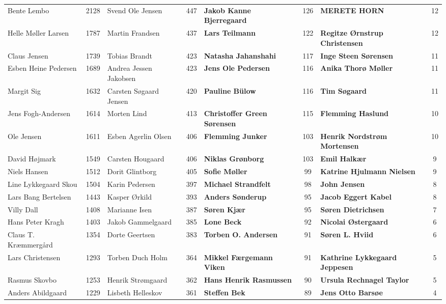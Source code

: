 \begin{table}[h]
\begin{tabular}{l|c|l|c|l|c|l|c}
		Bente Lembo & 2128 & Svend Ole Jensen & 447 & \textbf{Jakob Kanne Bjerregaard} & 126 & \textbf{MERETE HORN} & 12 \\
		Helle Møller Larsen & 1787 & Martin Frandsen & 437 & \textbf{Lars Teilmann} & 122 & \textbf{Regitze Ørnstrup Christensen} & 12 \\
		Claus Jensen & 1739 & Tobias Brandt & 423 & \textbf{Natasha Jahanshahi} & 117 & \textbf{Inge Steen Sørensen} & 11 \\
		Esben Heine Pedersen & 1689 & Andrea Jessen Jakobsen & 423 & \textbf{Jens Ole Pedersen} & 116 & \textbf{Anika Thorø Møller} & 11 \\
		Margit Sig & 1632 & Carsten Søgaard Jensen & 420 & \textbf{Pauline Bülow} & 116 & \textbf{Tim Søgaard} & 11 \\
		Jens Fogh-Andersen & 1614 & Morten Lind & 413 & \textbf{Christoffer Green Sørensen} & 115 & \textbf{Flemming Haslund} & 10 \\
		Ole Jensen & 1611 & Esben Agerlin Olsen & 406 & \textbf{Flemming Junker} & 103 & \textbf{Henrik Nordstrøm Mortensen} & 10 \\
		David Højmark & 1549 & Carsten Hougaard & 406 & \textbf{Niklas Grønborg} & 103 & \textbf{Emil Halkær} & 9 \\
		Niels Hansen & 1512 & Dorit Glintborg & 405 & \textbf{Sofie Møller} & 99 & \textbf{Katrine Hjulmann Nielsen} & 9 \\
		Line Lykkegaard Skou & 1504 & Karin Pedersen & 397 & \textbf{Michael Strandfelt} & 98 & \textbf{John Jensen} & 8 \\
		Lars Bang Bertelsen & 1443 & Kasper Ørkild & 393 & \textbf{Anders Sønderup} & 95 & \textbf{Jacob Eggert Kabel} & 8 \\
		Villy Dall & 1408 & Marianne Isen & 387 & \textbf{Søren Kjær} & 95 & \textbf{Søren Dietrichsen} & 7 \\
		Hans Peter Kragh & 1403 & Jakob Gammelgaard & 385 & \textbf{Lone Beck} & 92 & \textbf{Nicolai Østergaard} & 6 \\
		Claus T. Kræmmergård & 1354 & Dorte Geertsen & 383 & \textbf{Torben O. Andersen} & 91 & \textbf{Søren L. Hviid} & 6 \\
		Lars Christensen & 1293 & Torben Duch Holm & 364 & \textbf{Mikkel Færgemann Viken} & 91 & \textbf{Kathrine Lykkegaard Jeppesen} & 5 \\
		Rasmus Skovbo & 1253 & Henrik Strømgaard & 362 & \textbf{Hans Henrik Rasmussen} & 90 & \textbf{Ursula Rechnagel Taylor} & 5 \\
		Anders Abildgaard & 1229 & Lisbeth Helleskov & 361 & \textbf{Steffen Bek} & 89 & \textbf{Jens Otto Barsøe} & 4 \\

\end{tabular}
\end{table}
